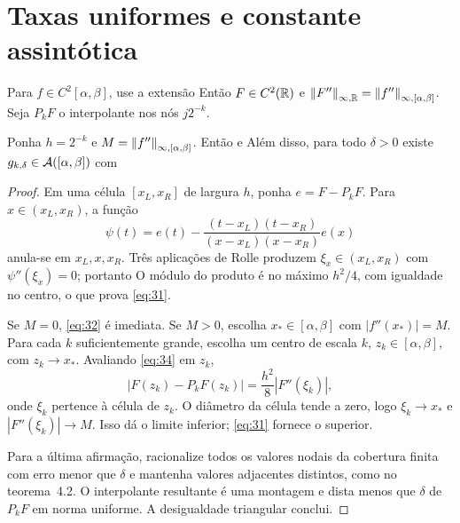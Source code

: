 \section{Taxas uniformes e constante assintótica}
Para $f\in C^2[\alpha,\beta]$, use a extensão
Então $F\in C^2(\mathbb R)$ e $\left\|F''\right\|_{\infty,\mathbb R}=\left\|f''\right\|_{\infty,[\alpha,\beta]}$. Seja $P_kF$ o interpolante nos nós $j2^{-k}$.

\begin{teorema}
Ponha $h=2^{-k}$ e $M=\left\|f''\right\|_{\infty,[\alpha,\beta]}$. Então
e
Além disso, para todo $\delta>0$ existe $g_{k,\delta}\in\mathcal A([\alpha,\beta])$ com
\end{teorema}
\begin{proof}
Em uma célula $[x_L,x_R]$ de largura $h$, ponha $e=F-P_kF$. Para $x\in(x_L,x_R)$, a função
\[
\psi(t)=e(t)-\frac{(t-x_L)(t-x_R)}{(x-x_L)(x-x_R)}e(x)
\]
anula-se em $x_L,x,x_R$. Três aplicações de Rolle produzem $\xi_x\in(x_L,x_R)$ com $\psi''(\xi_x)=0$; portanto
O módulo do produto é no máximo $h^2/4$, com igualdade no centro, o que prova \eqref{eq:31}.

Se $M=0$, \eqref{eq:32} é imediata. Se $M>0$, escolha $x_*\in[\alpha,\beta]$ com $|f''(x_*)|=M$. Para cada $k$ suficientemente grande, escolha um centro de escala $k$, $z_k\in[\alpha,\beta]$, com $z_k\to x_*$. Avaliando \eqref{eq:34} em $z_k$,
\[
|F(z_k)-P_kF(z_k)|=\frac{h^2}8|F''(\xi_k)|,
\]
onde $\xi_k$ pertence à célula de $z_k$. O diâmetro da célula tende a zero, logo $\xi_k\to x_*$ e $|F''(\xi_k)|\to M$. Isso dá o limite inferior; \eqref{eq:31} fornece o superior.

Para a última afirmação, racionalize todos os valores nodais da cobertura finita com erro menor que $\delta$ e mantenha valores adjacentes distintos, como no teorema~4.2. O interpolante resultante é uma montagem e dista menos que $\delta$ de $P_kF$ em norma uniforme. A desigualdade triangular conclui.
\end{proof}

